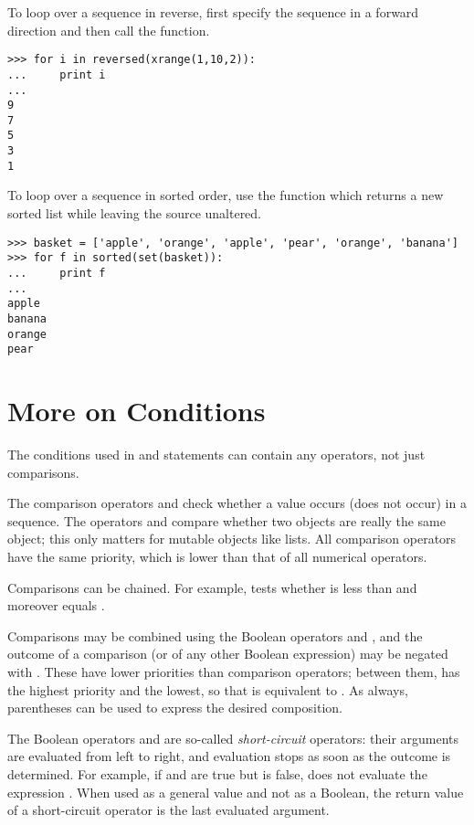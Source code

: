 \documentclass{manual}
\begin{document}
To loop over a sequence in reverse, first specify the sequence
in a forward direction and then call the 
function.

\begin{verbatim}
>>> for i in reversed(xrange(1,10,2)):
...     print i
...
9
7
5
3
1
\end{verbatim}

To loop over a sequence in sorted order, use the 
function which returns a new sorted list while leaving the source
unaltered.

\begin{verbatim}
>>> basket = ['apple', 'orange', 'apple', 'pear', 'orange', 'banana']
>>> for f in sorted(set(basket)):
...     print f
... 	
apple
banana
orange
pear
\end{verbatim}

\section{More on Conditions \label{conditions}}

The conditions used in  and  statements can
contain any operators, not just comparisons.

The comparison operators  and  check whether a value
occurs (does not occur) in a sequence.  The operators  and
 compare whether two objects are really the same object; this
only matters for mutable objects like lists.  All comparison operators
have the same priority, which is lower than that of all numerical
operators.

Comparisons can be chained.  For example,  tests
whether  is less than  and moreover  equals
.

Comparisons may be combined using the Boolean operators  and
, and the outcome of a comparison (or of any other Boolean
expression) may be negated with .  These have lower
priorities than comparison operators; between them,  has
the highest priority and  the lowest, so that
 is equivalent to .
As always, parentheses can be used to express the desired composition.

The Boolean operators  and  are so-called
\emph{short-circuit} operators: their arguments are evaluated from
left to right, and evaluation stops as soon as the outcome is
determined.  For example, if  and  are true but
 is false,  does not evaluate the
expression .  When used as a general value and not as a
Boolean, the return value of a short-circuit operator is the last
evaluated argument.
\end{document}
